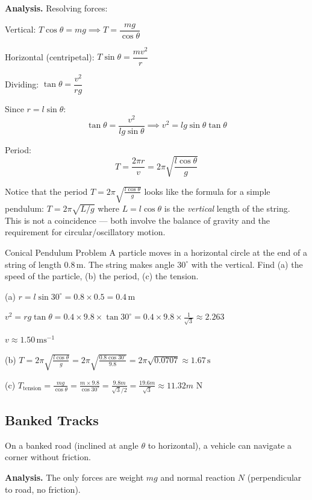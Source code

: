 \documentclass[12pt, a4paper]{book}
\newcommand{\ms}{\,\mathrm{ms}^{-1}}
\newcommand{\m}{\,\mathrm{m}}
\newcommand{\N}{\,\mathrm{N}}
\begin{document}
\textbf{Analysis.} Resolving forces:

Vertical: $T\cos\theta = mg \implies T = \dfrac{mg}{\cos\theta}$

Horizontal (centripetal): $T\sin\theta = \dfrac{mv^2}{r}$

Dividing: $\tan\theta = \dfrac{v^2}{rg}$

Since $r = l\sin\theta$:
\[
  \tan\theta = \frac{v^2}{lg\sin\theta} \implies v^2 = lg\sin\theta\tan\theta
\]

Period:
\[
  T = \frac{2\pi r}{v} = 2\pi\sqrt{\frac{l\cos\theta}{g}}
\]

\begin{intuitionbox}
Notice that the period $T = 2\pi\sqrt{\frac{l\cos\theta}{g}}$ looks like the formula for a simple pendulum: $T = 2\pi\sqrt{L/g}$ where $L = l\cos\theta$ is the \emph{vertical} length of the string. This is not a coincidence --- both involve the balance of gravity and the requirement for circular/oscillatory motion.
\end{intuitionbox}

\begin{exmp}{Conical Pendulum Problem}{}
A particle moves in a horizontal circle at the end of a string of length $0.8\m$. The string makes angle $30^\circ$ with the vertical. Find (a) the speed of the particle, (b) the period, (c) the tension.

\medskip
(a) $r = l\sin 30^\circ = 0.8 \times 0.5 = 0.4\m$

$v^2 = rg\tan\theta = 0.4 \times 9.8 \times \tan 30^\circ = 0.4 \times 9.8 \times \frac{1}{\sqrt{3}} \approx 2.263$

$v \approx 1.50\ms$

(b) $T = 2\pi\sqrt{\frac{l\cos\theta}{g}} = 2\pi\sqrt{\frac{0.8\cos 30^\circ}{9.8}} = 2\pi\sqrt{0.0707} \approx 1.67\,\mathrm{s}$

(c) $T_{\text{tension}} = \frac{mg}{\cos\theta} = \frac{m \times 9.8}{\cos 30^\circ} = \frac{9.8m}{\sqrt{3}/2} = \frac{19.6m}{\sqrt{3}} \approx 11.32m\,\N$
\end{exmp}

\subsection{Banked Tracks}

On a banked road (inclined at angle $\theta$ to horizontal), a vehicle can navigate a corner without friction.

\textbf{Analysis.} The only forces are weight $mg$ and normal reaction $N$ (perpendicular to road, no friction).
\end{document}
